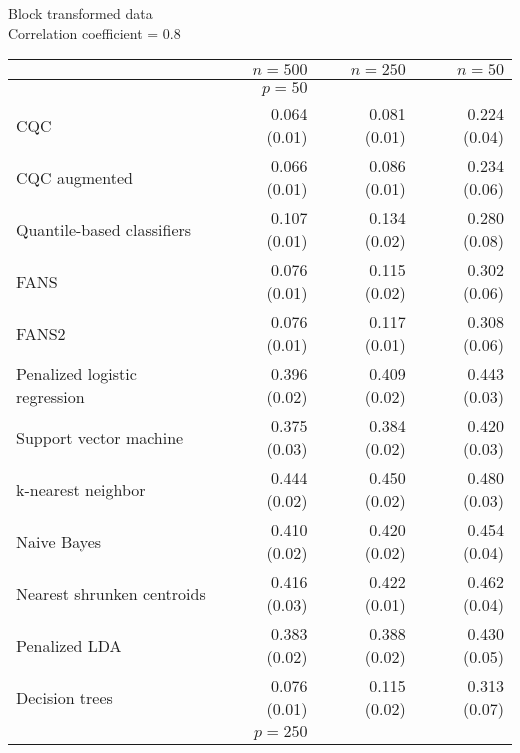 \begin{table}[p]
  \centering
  Block transformed data \\
  Correlation coefficient = 0.8 \\[2ex]
  \begin{adjustbox}{max size={\textwidth}{10cm}}
    \begin{tabular}{l@{\extracolsep{15mm}}rrr}
      
      \hline
      & $n=500$ & $n=250$ & $n=50$ \\ 
      \hline
      & $p = 50$ \\
      \hline

      CQC & 0.064 (0.01) & 0.081 (0.01) & 0.224 (0.04) \\ 
      CQC augmented & 0.066 (0.01) & 0.086 (0.01) & 0.234 (0.06) \\ 
      Quantile-based classifiers & 0.107 (0.01) & 0.134 (0.02) & 0.280 (0.08) \\ 
      FANS  & 0.076 (0.01) & 0.115 (0.02) & 0.302 (0.06) \\
      FANS2 & 0.076 (0.01) & 0.117 (0.01) & 0.308 (0.06) \\
      Penalized logistic regression & 0.396 (0.02) & 0.409 (0.02) & 0.443 (0.03) \\ 
      Support vector machine & 0.375 (0.03) & 0.384 (0.02) & 0.420 (0.03) \\ 
      k-nearest neighbor & 0.444 (0.02) & 0.450 (0.02) & 0.480 (0.03) \\ 
      Naive Bayes & 0.410 (0.02) & 0.420 (0.02) & 0.454 (0.04) \\ 
      Nearest shrunken centroids & 0.416 (0.03) & 0.422 (0.01) & 0.462 (0.04) \\ 
      Penalized LDA & 0.383 (0.02) & 0.388 (0.02) & 0.430 (0.05) \\ 
      Decision trees & 0.076 (0.01) & 0.115 (0.02) & 0.313 (0.07) \\ [2ex]

      \hline
      & $p = 250$ \\
      \hline


\end{tabular}
\end{adjustbox}
\end{table}
